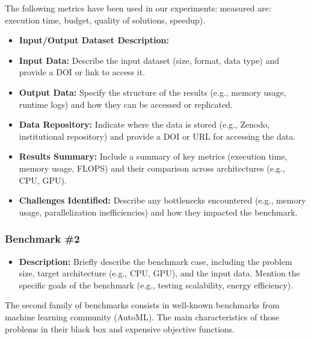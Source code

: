 The following metrics have been used in our experiments:  measured are: execution time, budget, quality of solutions, speedup).
\begin{itemize}
\item \textbf{Input/Output Dataset Description:}


\item \textbf{Input Data:} Describe the input dataset (size, format, data type) and provide a DOI or link to access it.

\item \textbf{Output Data:} Specify the structure of the results (e.g., memory usage, runtime logs) and how they can be accessed or replicated.

\item \textbf{Data Repository:} Indicate where the data is stored (e.g., Zenodo, institutional repository) and provide a DOI or URL for accessing the data.

\item \textbf{Results Summary:} Include a summary of key metrics (execution time, memory usage, FLOPS) and their comparison across architectures (e.g., CPU, GPU).

\item \textbf{Challenges Identified:} Describe any bottlenecks encountered (e.g., memory usage, parallelization inefficiencies) and how they impacted the benchmark.
\end{itemize}


\subsubsection{Benchmark \#2}
\begin{itemize}
\item \textbf{Description:} Briefly describe the benchmark case, including the problem size, target architecture (e.g., CPU, GPU), and the input data. Mention the specific goals of the benchmark (e.g., testing scalability, energy efficiency).
\end{itemize}

The second family of benchmarks consists in well-known benchmarks from machine learning community (AutoML). 
The main characteristics of those problems in their black box and expensive objective functions.

